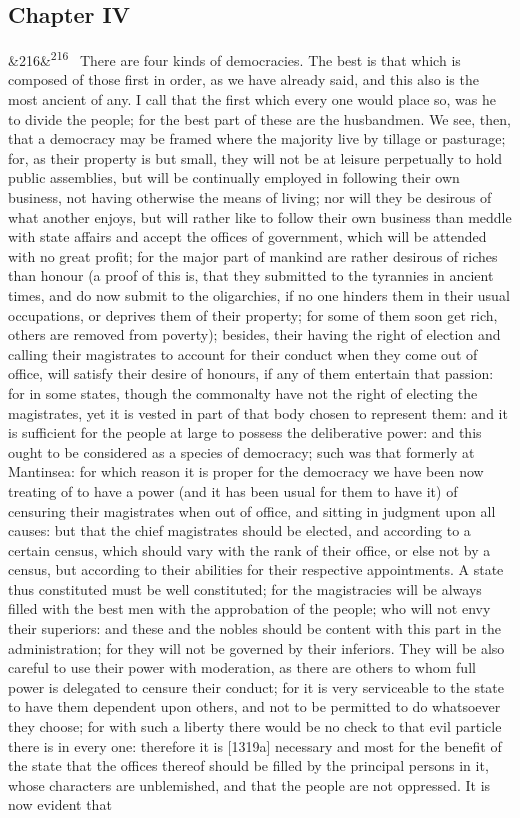 \documentclass[12pt]{article}
\newcommand{\para}[1][]{\par\noindent\ifx&#1&\else\textsuperscript{\footnotesize #1}~\fi}
\begin{document}
\subsection*{Chapter IV}

\para[216] There are four kinds of democracies. The best is that which is composed of those first in order, as we have already said, and this also is the most ancient of any. I call that the first which every one would place so, was he to divide the people; for the best part of these are the husbandmen. We see, then, that a democracy may be framed where the majority live by tillage or pasturage; for, as their property is but small, they will not be at leisure perpetually to hold public assemblies, but will be continually employed in following their own business, not having otherwise the means of living; nor will they be desirous of what another enjoys, but will rather like to follow their own business than meddle with state affairs and accept the offices of government, which will be attended with no great profit; for the major part of mankind are rather desirous of riches than honour (a proof of this is, that they submitted to the tyrannies in ancient times, and do now submit to the oligarchies, if no one hinders them in their usual occupations, or deprives them of their property; for some of them soon get rich, others are removed from poverty); besides, their having the right of election and calling their magistrates to account for their conduct when they come out of office, will satisfy their desire of honours, if any of them entertain that passion: for in some states, though the commonalty have not the right of electing the magistrates, yet it is vested in part of that body chosen to represent them: and it is sufficient for the people at large to possess the deliberative power: and this ought to be considered as a species of democracy; such was that formerly at Mantinsea: for which reason it is proper for the democracy we have been now treating of to have a power (and it has been usual for them to have it) of censuring their magistrates when out of office, and sitting in judgment upon all causes: but that the chief magistrates should be elected, and according to a certain census, which should vary with the rank of their office, or else not by a census, but according to their abilities for their respective appointments. A state thus constituted must be well constituted; for the magistracies will be always filled with the best men with the approbation of the people; who will not envy their superiors: and these and the nobles should be content with this part in the administration; for they will not be governed by their inferiors. They will be also careful to use their power with moderation, as there are others to whom full power is delegated to censure their conduct; for it is very serviceable to the state to have them dependent upon others, and not to be permitted to do whatsoever they choose; for with such a liberty there would be no check to that evil particle there is in every one: therefore it is [1319a] necessary and most for the benefit of the state that the offices thereof should be filled by the principal persons in it, whose characters are unblemished, and that the people are not oppressed. It is now evident that 
\end{document}
